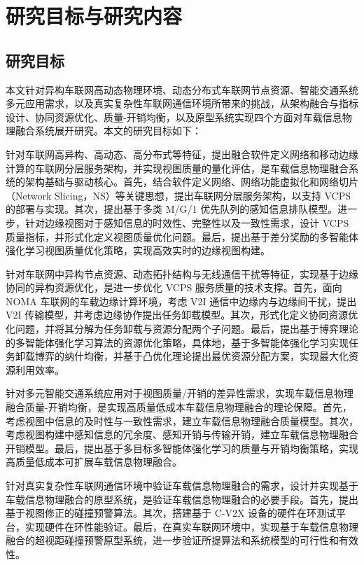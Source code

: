 \section{研究目标与研究内容}\label{section 1-4}

\subsection{研究目标}

本文针对异构车联网高动态物理环境、动态分布式车联网节点资源、智能交通系统多元应用需求，以及真实复杂性车联网通信环境所带来的挑战，从架构融合与指标设计、协同资源优化、质量-开销均衡，以及原型系统实现四个方面对车载信息物理融合系统展开研究。本文的研究目标如下：

 针对车联网高异构、高动态、高分布式等特征，提出融合软件定义网络和移动边缘计算的车联网分层服务架构，并实现视图质量的量化评估，是车载信息物理融合系统的架构基础与驱动核心。首先，结合软件定义网络、网络功能虚拟化和网络切片（Network Slicing，NS）等关键思想，提出车联网分层服务架构，以支持 VCPS 的部署与实现。其次，提出基于多类 M/G/1 优先队列的感知信息排队模型。进一步，针对边缘视图对于感知信息的时效性、完整性以及一致性需求，设计 VCPS 质量指标，并形式化定义视图质量优化问题。最后，提出基于差分奖励的多智能体强化学习视图质量优化策略，实现高效实时的边缘视图构建。

 针对车联网中异构节点资源、动态拓扑结构与无线通信干扰等特征，实现基于边缘协同的异构资源优化，是进一步优化 VCPS 服务质量的技术支撑。首先，面向 NOMA 车联网的车载边缘计算环境，考虑 V2I 通信中边缘内与边缘间干扰，提出 V2I 传输模型，并考虑边缘协作提出任务卸载模型。其次，形式化定义协同资源优化问题，并将其分解为任务卸载与资源分配两个子问题。最后，提出基于博弈理论的多智能体强化学习算法的资源优化策略，具体地，基于多智能体强化学习实现任务卸载博弈的纳什均衡，并基于凸优化理论提出最优资源分配方案，实现最大化资源利用效率。

 针对多元智能交通系统应用对于视图质量/开销的差异性需求，实现车载信息物理融合质量-开销均衡，是实现高质量低成本车载信息物理融合的理论保障。首先，考虑视图中信息的及时性与一致性需求，建立车载信息物理融合质量模型。其次，考虑视图构建中感知信息的冗余度、感知开销与传输开销，建立车载信息物理融合开销模型。最后，提出基于多目标多智能体强化学习的质量与开销均衡策略，实现高质量低成本可扩展车载信息物理融合。

 针对真实复杂性车联网通信环境中验证车载信息物理融合的需求，设计并实现基于车载信息物理融合的原型系统，是验证车载信息物理融合的必要手段。首先，提出基于视图修正的碰撞预警算法。其次，搭建基于 C-V2X 设备的硬件在环测试平台，实现硬件在环性能验证。最后，在真实车联网环境中，实现基于车载信息物理融合的超视距碰撞预警原型系统，进一步验证所提算法和系统模型的可行性和有效性。

